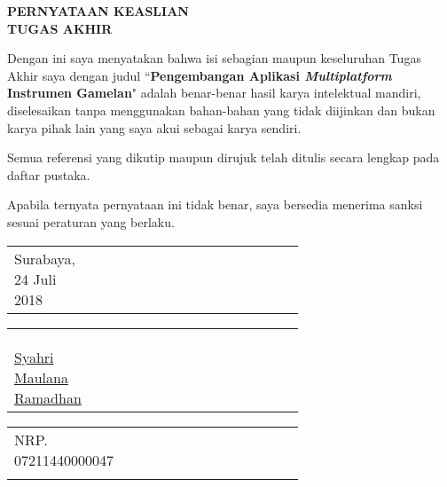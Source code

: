 \documentclass[a5paper, 10pt, twoside, bahasa]{report}
\begin{document}
\begin{center}
\Large\textbf{PERNYATAAN KEASLIAN\\}
\Large\textbf{TUGAS AKHIR}
\vspace{1ex}
\end{center}

\setlength{\parindent}{1cm} Dengan ini saya menyatakan bahwa isi sebagian maupun keseluruhan Tugas Akhir saya dengan judul ``\textbf{Pengembangan Aplikasi \textit{Multiplatform} Instrumen Gamelan}" adalah benar-benar hasil karya intelektual mandiri, diselesaikan tanpa menggunakan bahan-bahan yang tidak diijinkan dan bukan karya pihak lain yang saya akui sebagai karya sendiri.


\setlength{\parindent}{1cm} Semua referensi yang dikutip maupun dirujuk telah ditulis secara lengkap pada daftar pustaka. 


\setlength{\parindent}{1cm} Apabila ternyata pernyataan ini tidak benar, saya bersedia menerima sanksi sesuai peraturan yang berlaku.



\begin{adjustwidth}{6cm}{}
\begin{tabular}{lcp{0.65\linewidth}}
\centering Surabaya, 24 Juli 2018 & & \\
\end{tabular}
\end{adjustwidth}

\begin{adjustwidth}{6.100cm}{}
\begin{tabular}{lcp{0.65\linewidth}}
\\
\\
\\
\\
\centering \underline{Syahri Maulana Ramadhan} & & \\
\end{tabular}
\end{adjustwidth}

\begin{adjustwidth}{6.45cm}{}
\begin{tabular}{lcp{0.65\linewidth}}
\centering NRP. 07211440000047 & & \\ & & \\
\end{tabular}
\end{adjustwidth}
\end{document}

